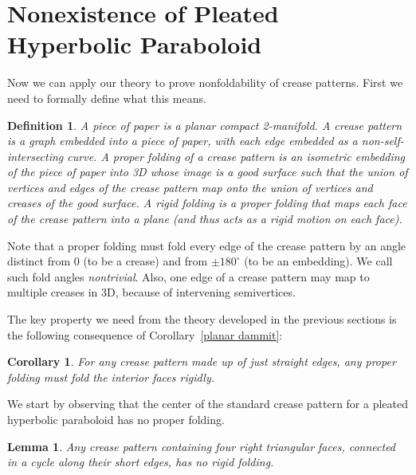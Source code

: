 \documentclass[11pt,letterpaper]{article}
\newtheorem{lemma}[theorem]{Lemma}
\newtheorem{corollary}[theorem]{Corollary}
\newtheorem{definition}{Definition}
\newcommand\term[1]{\emph{#1}}
\begin{document}
\section{Nonexistence of Pleated Hyperbolic Paraboloid}

Now we can apply our theory to prove nonfoldability of crease patterns.
First we need to formally define what this means.

\begin{definition}
  A \term{piece of paper} is a planar compact 2-manifold.
  A \term{crease pattern} is a graph embedded into a piece of paper,
  with each edge embedded as a non-self-intersecting curve.
  A \term{proper folding} of a crease pattern is an isometric embedding
  of the piece of paper into 3D whose image is a good surface such that
  the union of vertices and edges of the crease pattern map onto
  the union of vertices and creases of the good surface.
  A \term{rigid folding} is a proper folding that maps each face of the
  crease pattern into a plane (and thus acts as a rigid motion on each face).
\end{definition}

Note that a proper folding must fold every edge of the crease pattern
by an angle distinct from $0$ (to be a crease) and from $\pm 180^\circ$
(to be an embedding).  We call such fold angles \term{nontrivial}.
Also, one edge of a crease pattern may map to multiple creases in 3D,
because of intervening semivertices.

The key property we need from the theory developed in the previous sections
is the following consequence of Corollary~\ref{planar dammit}:

\begin{corollary} \label{interior rigid}
  For any crease pattern made up of just straight edges,
  any proper folding must fold the interior faces rigidly.
\end{corollary}

We start by observing that the center of the standard crease pattern
for a pleated hyperbolic paraboloid has no proper folding.

\begin{lemma} \label{four triangles}
  Any crease pattern containing four right triangular faces,
  connected in a cycle along their short edges,
  has no rigid folding.
\end{lemma}
\end{document}
